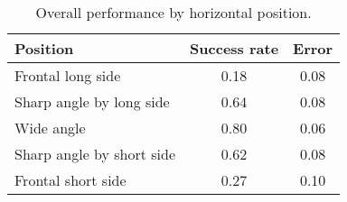 \begin{table}[H]
\centering
\begin{tabular}{@{} l *2c @{}}
\toprule
Position & Success rate & Error\\
\midrule
 Frontal long side 			& 0.18 & 0.08\\ 
 Sharp angle by long side  	& 0.64 & 0.08\\
 Wide angle 				& 0.80 & 0.06\\
 Sharp angle by short side 	& 0.62 & 0.08\\
 Frontal short side 		& 0.27 & 0.10\\
\bottomrule
 \end{tabular}
 \caption{Overall performance by horizontal position.}
\label{table:measurement_by_position}
\end{table}